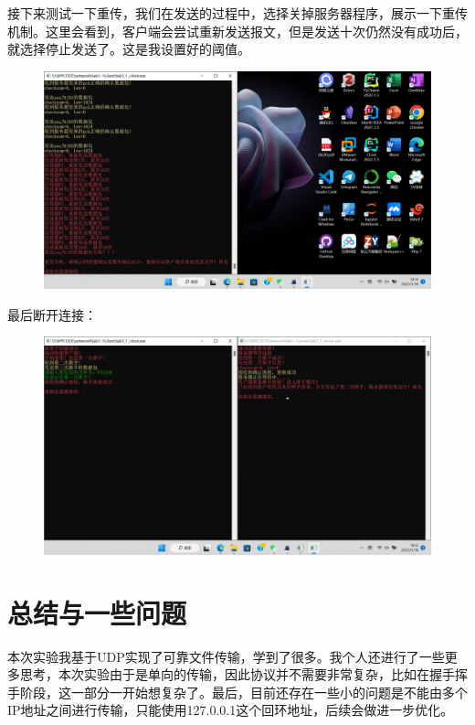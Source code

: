 \documentclass[UTF8,a4paper,10pt]{ctexart}
\begin{document}
接下来测试一下重传，我们在发送的过程中，选择关掉服务器程序，展示一下重传机制。这里会看到，客户端会尝试重新发送报文，但是发送十次仍然没有成功后，就选择停止发送了。这是我设置好的阈值。
\begin{figure}[H]
    \centering
    \includegraphics[scale=0.4]{计网8.png}
    \label{fig:8}
\end{figure}
最后断开连接：
\begin{figure}[H]
    \centering
    \includegraphics[scale=0.4]{计网9.png}
    \label{fig:9}
\end{figure}
\section{总结与一些问题}
本次实验我基于UDP实现了可靠文件传输，学到了很多。我个人还进行了一些更多思考，本次实验由于是单向的传输，因此协议并不需要非常复杂，比如在握手挥手阶段，这一部分一开始想复杂了。最后，目前还存在一些小的问题是不能由多个IP地址之间进行传输，只能使用127.0.0.1这个回环地址，后续会做进一步优化。
\end{document}
